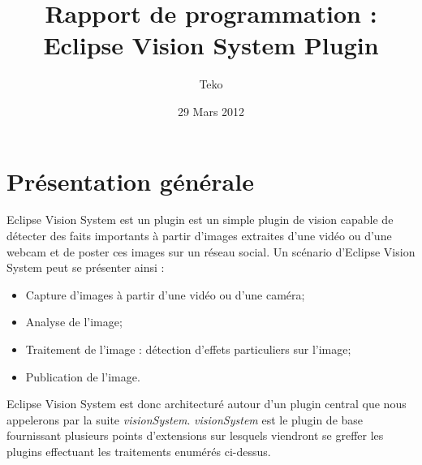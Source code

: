\documentclass[a4paper , 12pt]{article}
\title{\bf Rapport de programmation :\\ Eclipse Vision System Plugin}
\author{Teko \bsc{hemazro}}
\date{29 Mars 2012}
\begin{document}
\maketitle
\newpage
\tableofcontents 
\newpage

\section{Présentation générale}
Eclipse Vision System est un plugin est un simple plugin de vision capable de détecter des faits importants à partir d'images extraites d'une vidéo ou d'une webcam et de poster ces images sur un réseau social. Un scénario d'Eclipse Vision System peut se présenter ainsi :
\begin{itemize}
	\item Capture d'images à partir d'une vidéo ou d'une caméra;
	\item Analyse de l'image; 
	\item Traitement de l'image : détection d'effets particuliers sur l'image;
	\item Publication de l'image.
\end{itemize}

Eclipse Vision System est donc architecturé autour d'un plugin central que nous appelerons par la suite {\it visionSystem}. {\it visionSystem} est le plugin de base fournissant plusieurs points d'extensions sur lesquels viendront se greffer les plugins effectuant les traitements enumérés ci-dessus.
\end{document}
